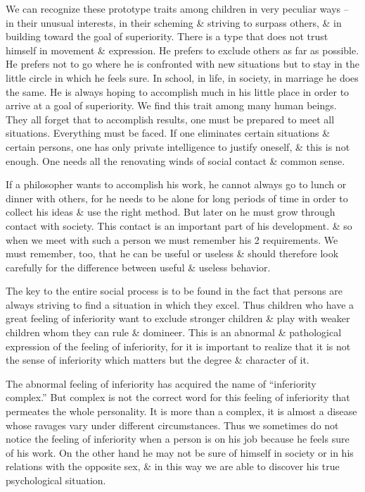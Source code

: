 \documentclass{article}
\numberwithin{equation}{section}
\begin{document}
We can recognize these prototype traits among children in very peculiar ways -- in their unusual interests, in their scheming \& striving to surpass others, \& in building toward the goal of superiority. There is a type that does not trust himself in movement \& expression. He prefers to exclude others as far as possible. He prefers not to go where he is confronted with new situations but to stay in the little circle in which he feels sure. In school, in life, in society, in marriage he does the same. He is always hoping to accomplish much in his little place in order to arrive at a goal of superiority. We find this trait among many human beings. They all forget that to accomplish results, one must be prepared to meet all situations. Everything must be faced. If one eliminates certain situations \& certain persons, one has only private intelligence to justify oneself, \& this is not enough. One needs all the renovating winds of social contact \& common sense.

If a philosopher wants to accomplish his work, he cannot always go to lunch or dinner with others, for he needs to be alone for long periods of time in order to collect his ideas \& use the right method. But later on he must grow through contact with society. This contact is an important part of his development. \& so when we meet with such a person we must remember his 2 requirements. We must remember, too, that he can be useful or useless \& should therefore look carefully for the difference between useful \& useless behavior.

The key to the entire social process is to be found in the fact that persons are always striving to find a situation in which they excel. Thus children who have a great feeling of inferiority want to exclude stronger children \& play with weaker children whom they can rule \& domineer. This is an abnormal \& pathological expression of the feeling of inferiority, for it is important to realize that it is not the sense of inferiority which matters but the degree \& character of it.

The abnormal feeling of inferiority has acquired the name of ``inferiority complex.'' But complex is not the correct word for this feeling of inferiority that permeates the whole personality. It is more than a complex, it is almost a disease whose ravages vary under different circumstances. Thus we sometimes do not notice the feeling of inferiority when a person is on his job because he feels sure of his work. On the other hand he may not be sure of himself in society or in his relations with the opposite sex, \& in  this way we are able to discover his true psychological situation.
\end{document}

